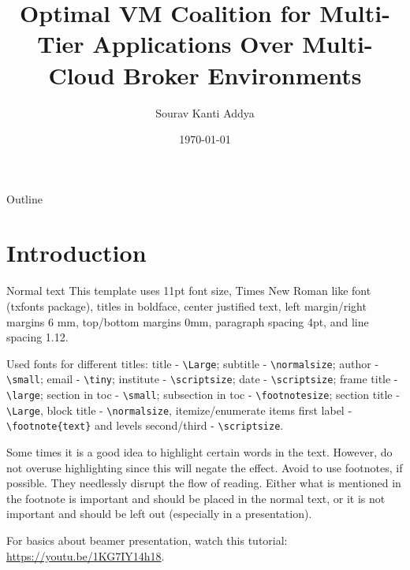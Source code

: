 \documentclass{beamer}
\title[Beamer Presentation: Various Links]{Optimal VM Coalition for Multi-Tier Applications Over Multi-Cloud Broker Environments}
\subtitle{}
\author[Sourav Kanti Addya]{Sourav Kanti Addya}
\institute[IIT Kharagpur,India]{IIT Kharagpur,India\\ kanti.sourav@ieee.org}
\date[\today]{\scriptsize \today}
\begin{document}
\backgroundcanvas{}

\section[Outline]{}

\begin{frame}{Outline}
	\tableofcontents
\end{frame}

\section{Introduction}

\begin{frame}[fragile]{Normal text}
	\scriptsize 		
	This template uses 11pt font size, Times New Roman like font (txfonts package), titles in boldface, center justified text, left margin/right margins 6 mm, top/bottom margins 0mm, paragraph spacing 4pt, and line spacing 1.12.  
	
	Used fonts for different titles: title - \verb|\Large|; subtitle - \verb|\normalsize|; author - \verb|\small|; email - \verb|\tiny|; institute - \verb|\scriptsize|; date - \verb|\scriptsize|; frame title - \verb|\large|; section in toc - \verb|\small|; subsection in toc - \verb|\footnotesize|; section title - \verb|\Large|, block title - \verb|\normalsize|, itemize/enumerate items first label - \verb|\footnote{text}| and levels second/third - \verb|\scriptsize|. 
	
	Some times it is a good idea to \alert{highlight} certain words in the text. However, do not overuse highlighting since this will negate the effect.  Avoid to use footnotes, if possible. They needlessly disrupt the flow of reading. Either what is mentioned in the footnote is
	important and should be placed in the normal text, or it is not important and should be left out (especially in a presentation).
	
	For basics about beamer presentation, watch this tutorial: \href{https://youtu.be/1KG7IY14h18}{https://youtu.be/1KG7IY14h18}. 
\end{frame}
\end{document}
